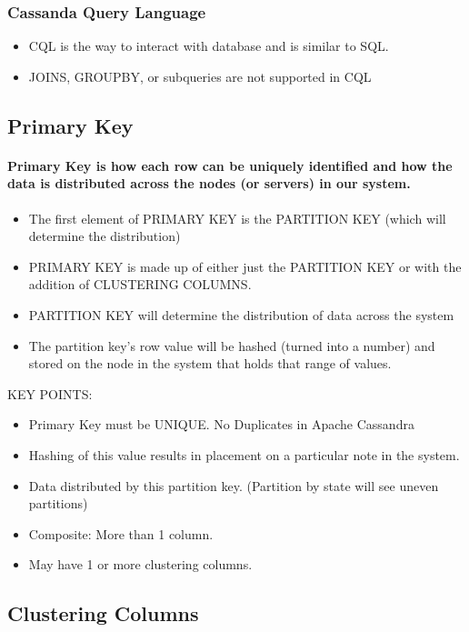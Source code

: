 \documentclass[
	paper=a4,%
	pagesize,%
	8pt, fleqn,%
	headings=small,%
	notitlepage,%
	parskip=never]%
	{scrreprt}
\begin{document}
\begin{multicols*}{3}
\subsubsection{Cassanda Query Language}
\begin{itemize}
\item CQL is the way to interact with database and is similar to SQL.
\item JOINS, GROUPBY, or subqueries are not supported in CQL
\end{itemize}

\subsection{Primary Key}
\paragraph{Primary Key is how each row can be uniquely identified and how the data is distributed across the nodes (or servers) in our system.}

\begin{itemize}
\item The first element of PRIMARY KEY is the PARTITION KEY (which will determine the distribution)
\item PRIMARY KEY is made up of either just the PARTITION KEY or with the addition of CLUSTERING COLUMNS.
\item PARTITION KEY will determine the distribution of data across the system
\item The partition key's row value will be hashed (turned into a number) and stored on the node in the system that holds that range of values.
\end{itemize}

KEY POINTS:

\begin{itemize}
\item Primary Key must be UNIQUE. No Duplicates in Apache Cassandra
\item Hashing of this value results in placement on a particular note in the system.
\item Data distributed by this partition key. (Partition by state will see uneven partitions)
\item Composite: More than 1 column. 
\item May have 1 or more clustering columns.
\end{itemize}

\subsection{Clustering Columns}

\end{multicols*}
\end{document}
